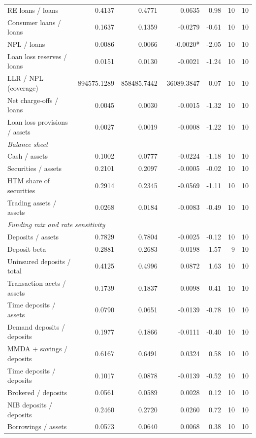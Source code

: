 \begin{tabular}{lrrrrrr}
RE loans / loans & 0.4137 & 0.4771 & 0.0635 & 0.98 & 10 & 10 \\
Consumer loans / loans & 0.1637 & 0.1359 & -0.0279 & -0.61 & 10 & 10 \\
NPL / loans & 0.0086 & 0.0066 & -0.0020* & -2.05 & 10 & 10 \\
Loan loss reserves / loans & 0.0151 & 0.0130 & -0.0021 & -1.24 & 10 & 10 \\
LLR / NPL (coverage) & 894575.1289 & 858485.7442 & -36089.3847 & -0.07 & 10 & 10 \\
Net charge-offs / loans & 0.0045 & 0.0030 & -0.0015 & -1.32 & 10 & 10 \\
Loan loss provisions / assets & 0.0027 & 0.0019 & -0.0008 & -1.22 & 10 & 10 \\
\midrule
\multicolumn{7}{l}{\emph{Balance sheet}} \\
\midrule
Cash / assets & 0.1002 & 0.0777 & -0.0224 & -1.18 & 10 & 10 \\
Securities / assets & 0.2101 & 0.2097 & -0.0005 & -0.02 & 10 & 10 \\
HTM share of securities & 0.2914 & 0.2345 & -0.0569 & -1.11 & 10 & 10 \\
Trading assets / assets & 0.0268 & 0.0184 & -0.0083 & -0.49 & 10 & 10 \\
\midrule
\multicolumn{7}{l}{\emph{Funding mix and rate sensitivity}} \\
\midrule
Deposits / assets & 0.7829 & 0.7804 & -0.0025 & -0.12 & 10 & 10 \\
Deposit beta & 0.2881 & 0.2683 & -0.0198 & -1.57 & 9 & 10 \\
Uninsured deposits / total & 0.4125 & 0.4996 & 0.0872 & 1.63 & 10 & 10 \\
Transaction accts / assets & 0.1739 & 0.1837 & 0.0098 & 0.41 & 10 & 10 \\
Time deposits / assets & 0.0790 & 0.0651 & -0.0139 & -0.78 & 10 & 10 \\
Demand deposits / deposits & 0.1977 & 0.1866 & -0.0111 & -0.40 & 10 & 10 \\
MMDA + savings / deposits & 0.6167 & 0.6491 & 0.0324 & 0.58 & 10 & 10 \\
Time deposits / deposits & 0.1017 & 0.0878 & -0.0139 & -0.52 & 10 & 10 \\
Brokered / deposits & 0.0561 & 0.0589 & 0.0028 & 0.12 & 10 & 10 \\
NIB deposits / deposits & 0.2460 & 0.2720 & 0.0260 & 0.72 & 10 & 10 \\
Borrowings / assets & 0.0573 & 0.0640 & 0.0068 & 0.38 & 10 & 10 \\

\end{tabular}
